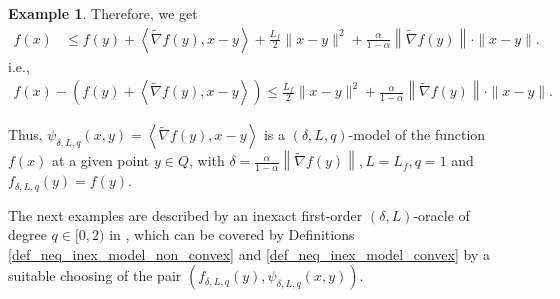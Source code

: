 \documentclass[11pt]{amsart}
\theoremstyle{definition}
\newtheorem{example}[theorem]{Example}
\numberwithin{equation}{section}
\begin{document}
\begin{example}
Therefore,  we get 
\begin{align*}
    f(x) & \leq f(y) + \left\langle \widetilde{\nabla}  f(y),  x  - y \right\rangle + \frac{L_f}{2} \|x - y \|^2  + \frac{\alpha}{1-\alpha} \left\|\widetilde{\nabla} f(y)\right\| \cdot \| x - y\|.
\end{align*}
i.e., 
\begin{align*}
    f(x) - \left(f(y) + \left\langle \widetilde{\nabla}  f(y),  x  - y \right\rangle \right)  \leq  \frac{L_f}{2} \|x - y \|^2  + \frac{\alpha}{1-\alpha} \left\|\widetilde{\nabla} f(y)\right \| \cdot \| x - y\|.
\end{align*}

Thus, $\psi_{\delta, L, q} (x,y) =\left\langle \widetilde{\nabla}f(y), x - y \right\rangle $ is a $(\delta, L, q)$-model of the function $f(x)$ at a given point $y \in Q$, with $\delta = \frac{\alpha}{1-\alpha} \left\|\widetilde{\nabla} f(y)\right\|, L = L_f, q = 1$ and $f_{\delta, L, q} (y) = f(y)$. 
\end{example}

The next examples are described by an inexact first-order $(\delta, L)$-oracle of degree $q \in [0, 2)$ in \cite{Nabou2024qoracle}, which can be covered by Definitions  \ref{def_neq_inex_model_non_convex} and \ref{def_neq_inex_model_convex} by a suitable choosing of the pair $\left(f_{\delta,L, q}(y), \psi_{\delta, L, q} (x, y )\right)$. 
\end{document}
